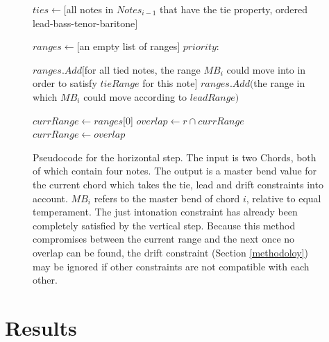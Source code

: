 \documentclass[a4paper]{article}
\newlength\myindent
\newcommand{\IndState}[1][1]{\State\hspace{#1\myindent}}
\begin{document}
\begin{figure}
	\begin{algorithmic}[1]
		\State $\mathit{ties} \gets [$all notes in $\mathit{Notes}_{i-1}$ that have the tie property, ordered lead-bass-tenor-baritone$]$
		
		\State $\mathit{ranges} \gets [$an empty list of ranges$]$
		 $\mathit{priority}$:
		
		\IndState $\mathit{ranges}.Add[$for all tied notes, the range $\mathit{MB}_i$ could move into in order to satisfy $\mathit{tieRange}$ for this note$]$
		\IndState $\mathit{ranges.Add}($the range in which $\mathit{MB}_i$ could move according to $\mathit{leadRange})$
		
		\State{}
		\Else
		\State $\mathit{currRange} \gets \mathit{ranges}$[0]
		\State $\mathit{overlap} \gets r \cap \mathit{currRange}$
			\State {}
		\Else
			\State $\mathit{currRange} \gets \mathit{overlap}$
		\EndIf
		\EndFor
		
		\State{}
		\EndIf
		\EndProcedure
	\end{algorithmic}
	\caption{Pseudocode for the horizontal step. The input is two Chords, both of which contain four notes. The output is a master bend value for the current chord which takes the tie, lead and drift constraints into account. $\mathit{MB}_i$ refers to the master bend of chord $i$, relative to equal temperament. The just intonation constraint has already been completely satisfied by the vertical step. Because this method compromises between the current range and the next once no overlap can be found, the drift constraint (Section \ref{methodoloy}) may be ignored if other constraints are not compatible with each other.}
	\label{fig:pseudocodeH}
\end{figure}

\section{Results}
\label{results}
\end{document}
